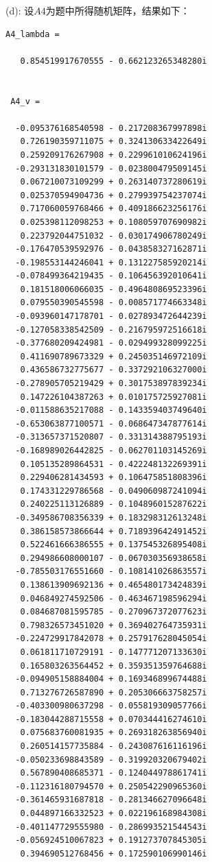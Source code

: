 \documentclass[12pt,a4paper,utf8]{ctexart}
\begin{document}
\begin{enumerate}
(d):
设$A4$为题中所得随机矩阵，结果如下：
\begin{lstlisting}[frame=single]
A4_lambda =

   0.854519917670555 - 0.662123265348280i
 
 
 A4_v =
 
  -0.095376168540598 - 0.217208367997898i
   0.726190359711075 + 0.324130633422649i
   0.259209176267908 + 0.229961010624196i
  -0.293131830101579 - 0.023800479509145i
   0.067210073109299 + 0.263140737280619i
   0.025370594904736 + 0.279939754237074i
   0.717060059768466 + 0.409186623256176i
   0.025398112098253 + 0.108059707690982i
   0.223792044751032 - 0.030174906780249i
  -0.176470539592976 - 0.043858327162871i
  -0.198553144246041 + 0.131227585920214i
  -0.078499364219435 - 0.106456392010641i
   0.181518006066035 - 0.496480869523396i
   0.079550390545598 - 0.008571774663348i
  -0.093960147178701 - 0.027893472644239i
  -0.127058338542509 - 0.216795972516618i
  -0.377680209424981 - 0.029499328099225i
   0.411690789673329 + 0.245035146972109i
   0.436586732775677 - 0.337292106327000i
  -0.278905705219429 + 0.301753897839234i
   0.147226104387263 + 0.010175725927081i
  -0.011588635217088 - 0.143359403749640i
  -0.653063877100571 - 0.068647347877614i
  -0.313657371520807 - 0.331314388795193i
  -0.168989026442825 - 0.062701103145269i
   0.105135289864531 - 0.422248132269391i
   0.229406281434593 + 0.106475851808396i
   0.174331229786568 - 0.049060987241094i
   0.240225113126889 - 0.104896015287622i
  -0.349586708356339 + 0.183298312613248i
   0.386158573866644 + 0.718939642491452i
   0.522461666386555 + 0.137545326895408i
   0.294986608000107 - 0.067030356938658i
  -0.785503176551660 - 0.108141026863557i
   0.138613909692136 + 0.465480173424839i
   0.046849274592506 - 0.463467198596294i
   0.084687081595785 - 0.270967372077623i
   0.798326573451020 + 0.369402764735931i
  -0.224729917842078 + 0.257917628045054i
   0.061811710729191 - 0.147771207133630i
   0.165803263564452 + 0.359351359764688i
  -0.094905158884004 + 0.169346899674488i
   0.713276726587890 + 0.205306663758257i
  -0.403300980637298 - 0.055819309057766i
  -0.183044288715558 + 0.070344416274610i
   0.075683760081935 + 0.269318263856940i
   0.260514157735884 - 0.243087616116196i
  -0.050233698843589 - 0.319920320679402i
   0.567890408685371 - 0.124044978861741i
  -0.112316180794570 + 0.250542290965360i
  -0.361465931687818 - 0.281346627096648i
   0.044897166332523 + 0.022196168984308i
  -0.401147729555980 - 0.286993521544543i
  -0.056924510067823 + 0.191273707845305i
   0.394690512768456 + 0.172590106990146i

\end{lstlisting}
\end{enumerate}
\end{document}
